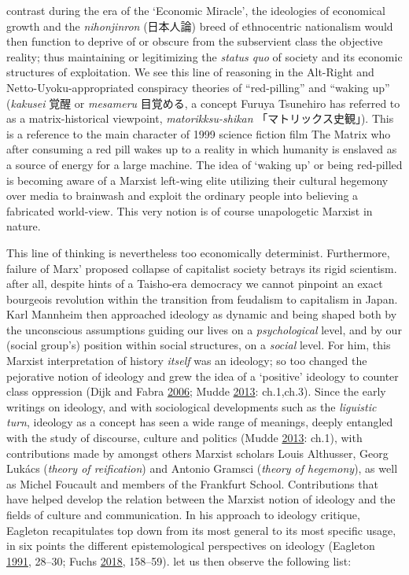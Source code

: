 \documentclass[10pt,british,A4paper,,openany]{memoir}
\begin{document}
contrast during the era of the `Economic Miracle', the ideologies of
economical growth and the \emph{nihonjinron} (日本人論) breed of
ethnocentric nationalism would then function to deprive of or obscure
from the subservient class the objective reality; thus maintaining or
legitimizing the \emph{status quo} of society and its economic
structures of exploitation. We see this line of reasoning in the
Alt-Right and Netto-Uyoku-appropriated conspiracy theories of
``red-pilling'' and ``waking up'' (\emph{kakusei} 覚醒 or
\emph{mesameru} 目覚める, a concept Furuya Tsunehiro has referred to as
a matrix-historical viewpoint, \emph{matorikksu-shikan}
「マトリックス史観」). This is a reference to the main character of 1999
science fiction film The Matrix who after consuming a red pill wakes up
to a reality in which humanity is enslaved as a source of energy for a
large machine. The idea of `waking up' or being red-pilled is becoming
aware of a Marxist left-wing elite utilizing their cultural hegemony
over media to brainwash and exploit the ordinary people into believing a
fabricated world-view. This very notion is of course unapologetic
Marxist in nature.

This line of thinking is nevertheless too economically determinist.
Furthermore, failure of Marx' proposed collapse of capitalist society
betrays its rigid scientism. after all, despite hints of a Taisho-era
democracy we cannot pinpoint an exact bourgeois revolution within the
transition from feudalism to capitalism in Japan. Karl Mannheim then
approached ideology as dynamic and being shaped both by the unconscious
assumptions guiding our lives on a \emph{psychological} level, and by
our (social group's) position within social structures, on a
\emph{social} level. For him, this Marxist interpretation of history
\emph{itself} was an ideology; so too changed the pejorative notion of
ideology and grew the idea of a `positive' ideology to counter class
oppression (Dijk and Fabra
\protect\hyperlink{ref-van_dijk_politics_2006}{2006}; Mudde
\protect\hyperlink{ref-mudde_oxford_2013}{2013}: ch.1,ch.3). Since the
early writings on ideology, and with sociological developments such as
the \emph{liguistic turn}, ideology as a concept has seen a wide range
of meanings, deeply entangled with the study of discourse, culture and
politics (Mudde \protect\hyperlink{ref-mudde_oxford_2013}{2013}: ch.1),
with contributions made by amongst others Marxist scholars Louis
Althusser, Georg Lukács (\emph{theory of reification}) and Antonio
Gramsci (\emph{theory of hegemony}), as well as Michel Foucault and
members of the Frankfurt School. Contributions that have helped develop
the relation between the Marxist notion of ideology and the fields of
culture and communication. In his approach to ideology critique,
Eagleton recapitulates top down from its most general to its most
specific usage, in six points the different epistemological perspectives
on ideology (Eagleton
\protect\hyperlink{ref-eagleton_ideology:_1991}{1991}, 28--30; Fuchs
\protect\hyperlink{ref-fuchs_racism_2018}{2018}, 158--59). let us then
observe the following list:
\end{document}
